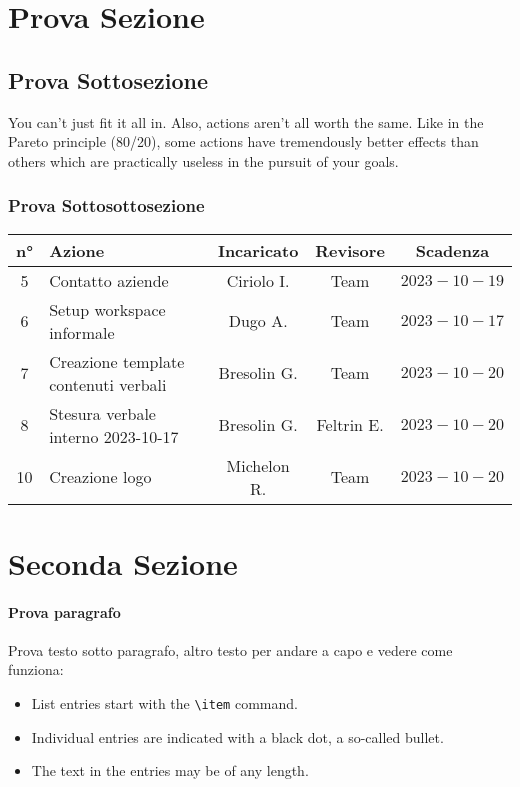 \documentclass[10pt, a4paper]{article}
\title{\titolo}
\author{SWEetCode}
\begin{document}



\newpage

\tableofcontents
\newpage

\section{Prova Sezione}
\subsection{Prova Sottosezione}

You can't just fit it all in. Also, actions aren't all worth the same. Like in the Pareto principle (80/20), some actions have tremendously better effects than others which are practically useless in the pursuit of your goals. 

\subsubsection{Prova Sottosottosezione}
{\renewcommand{\arraystretch}{1.5}
\begin{tabularx}{\textwidth}{c|X|c|c|c}
\textbf{n°} & \textbf{Azione} & \textbf{Incaricato} & \textbf{Revisore} & \textbf{Scadenza} \\
\hline
5 & Contatto aziende & Ciriolo I. & Team & $2023-10-19$ \\
\hline
6 & Setup workspace informale & Dugo A. & Team & $2023-10-17$ \\
\hline
7 & Creazione template contenuti verbali & Bresolin G. & Team & $2023-10-20$ \\
\hline
8 & Stesura verbale interno 2023-10-17 & Bresolin G. & Feltrin E. & $2023-10-20$ \\
\hline
10 & Creazione logo & Michelon R. & Team & $2023-10-20$ \\
\end{tabularx}}

\section{Seconda Sezione}
\paragraph{Prova paragrafo} Prova testo sotto paragrafo, altro testo per andare a capo e vedere come funziona:
\begin{itemize}
  \item List entries start with the \verb|\item| command.
  \item Individual entries are indicated with a black dot, a so-called bullet.
  \item The text in the entries may be of any length.
\end{itemize}
\end{document}
